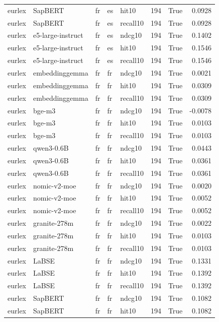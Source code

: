 \begin{tabular}{lllllrrr}
eurlex & SapBERT & fr & es & hit10 & 194 & True & 0.0928 \\
eurlex & SapBERT & fr & es & recall10 & 194 & True & 0.0928 \\
eurlex & e5-large-instruct & fr & es & ndcg10 & 194 & True & 0.1402 \\
eurlex & e5-large-instruct & fr & es & hit10 & 194 & True & 0.1546 \\
eurlex & e5-large-instruct & fr & es & recall10 & 194 & True & 0.1546 \\
eurlex & embeddinggemma & fr & fr & ndcg10 & 194 & True & 0.0021 \\
eurlex & embeddinggemma & fr & fr & hit10 & 194 & True & 0.0309 \\
eurlex & embeddinggemma & fr & fr & recall10 & 194 & True & 0.0309 \\
eurlex & bge-m3 & fr & fr & ndcg10 & 194 & True & -0.0078 \\
eurlex & bge-m3 & fr & fr & hit10 & 194 & True & 0.0103 \\
eurlex & bge-m3 & fr & fr & recall10 & 194 & True & 0.0103 \\
eurlex & qwen3-0.6B & fr & fr & ndcg10 & 194 & True & 0.0443 \\
eurlex & qwen3-0.6B & fr & fr & hit10 & 194 & True & 0.0361 \\
eurlex & qwen3-0.6B & fr & fr & recall10 & 194 & True & 0.0361 \\
eurlex & nomic-v2-moe & fr & fr & ndcg10 & 194 & True & 0.0020 \\
eurlex & nomic-v2-moe & fr & fr & hit10 & 194 & True & 0.0052 \\
eurlex & nomic-v2-moe & fr & fr & recall10 & 194 & True & 0.0052 \\
eurlex & granite-278m & fr & fr & ndcg10 & 194 & True & 0.0022 \\
eurlex & granite-278m & fr & fr & hit10 & 194 & True & 0.0103 \\
eurlex & granite-278m & fr & fr & recall10 & 194 & True & 0.0103 \\
eurlex & LaBSE & fr & fr & ndcg10 & 194 & True & 0.1331 \\
eurlex & LaBSE & fr & fr & hit10 & 194 & True & 0.1392 \\
eurlex & LaBSE & fr & fr & recall10 & 194 & True & 0.1392 \\
eurlex & SapBERT & fr & fr & ndcg10 & 194 & True & 0.1082 \\
eurlex & SapBERT & fr & fr & hit10 & 194 & True & 0.1082 \\

\end{tabular}
